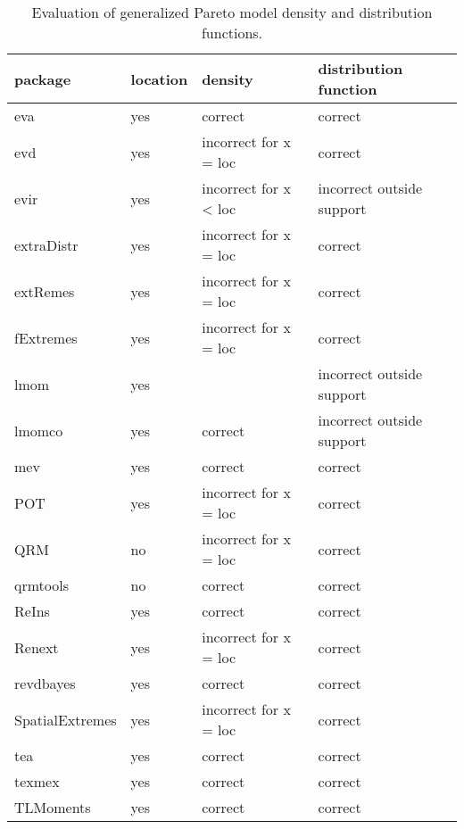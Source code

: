 \documentclass[
  letterpaper,
  DIV=11,
  numbers=noendperiod]{scrartcl}
\begin{document}
\hypertarget{tbl-gp1}{}
\begin{table}
\caption{\label{tbl-gp1}Evaluation of generalized Pareto model density and distribution
functions. }\tabularnewline

\centering
\begin{tabular}{llll}
\toprule
package & location & density & distribution function\\
\midrule
eva & yes & correct & correct\\
evd & yes & incorrect for x = loc & correct\\
evir & yes & incorrect for x < loc & incorrect outside support\\
extraDistr & yes & incorrect for x = loc & correct\\
extRemes & yes & incorrect for x = loc & correct\\
\addlinespace
fExtremes & yes & incorrect for x = loc & correct\\
lmom & yes &  & incorrect outside support\\
lmomco & yes & correct & incorrect outside support\\
mev & yes & correct & correct\\
POT & yes & incorrect for x = loc & correct\\
\addlinespace
QRM & no & incorrect for x = loc & correct\\
qrmtools & no & correct & correct\\
ReIns & yes & correct & correct\\
Renext & yes & incorrect for x = loc & correct\\
revdbayes & yes & correct & correct\\
\addlinespace
SpatialExtremes & yes & incorrect for x = loc & correct\\
tea & yes & correct & correct\\
texmex & yes & correct & correct\\
TLMoments & yes & correct & correct\\
\bottomrule
\end{tabular}
\end{table}
\end{document}
